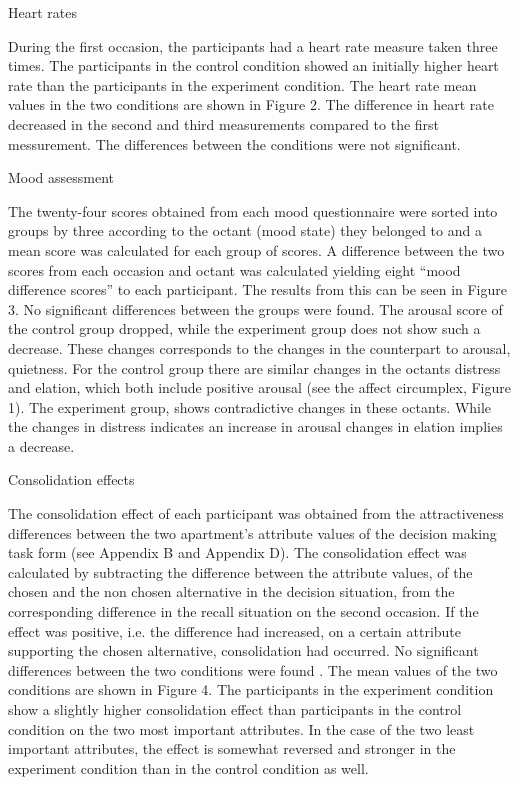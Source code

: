 \documentclass[jou,11pt]{apa6}
\begin{document}
Heart rates

During the first occasion, the participants had a heart rate measure
taken three times. The participants in the control condition showed an
initially higher heart rate than the participants in the experiment
condition. The heart rate mean values in the two conditions are shown
in Figure 2.  The difference in heart rate decreased in the second and
third measurements compared to the first messurement.  The differences
between the conditions were not significant.

Mood assessment

The twenty-four scores obtained from each mood questionnaire  were
sorted into groups by three according to the octant (mood state) they
belonged to and a mean score was calculated for each group of scores.
A difference between the two scores from each occasion and octant was
calculated yielding eight ``mood difference scores'' to each
participant.  The results from this can be seen in Figure 3.  No
significant differences between the groups were found.  The arousal
score of the control group dropped, while the experiment group does
not show such a decrease. These changes corresponds to the changes in
the counterpart to arousal, quietness.  For the control group there
are similar changes in the octants distress and elation, which both
include positive arousal (see the affect circumplex, Figure 1). The
experiment group, shows contradictive changes in these octants. While
the changes in distress indicates an increase in arousal changes in
elation implies a decrease.















Consolidation effects

The consolidation effect of each participant was obtained from the
attractiveness differences between the two apartment's attribute
values of the decision making task form (see Appendix B and Appendix
D).  The consolidation effect was calculated by subtracting the
difference between the attribute values, of the chosen and the non
chosen alternative in the decision situation, from the corresponding
difference in the recall situation on the second occasion.  If the
effect was positive, i.e. the difference had increased, on a certain
attribute supporting the chosen alternative, consolidation had
occurred.  No significant differences between the two conditions were
found . The mean values of the two conditions are shown in Figure 4.
The participants in the experiment condition show a slightly higher
consolidation effect than participants in the control condition on the
two most important attributes.  In the case of the two least important
attributes, the effect is somewhat reversed and stronger in the
experiment condition than in the control condition as well.
\end{document}
